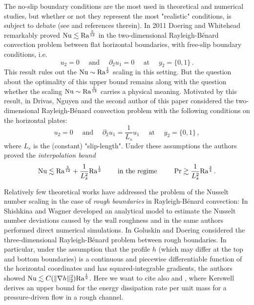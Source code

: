 \documentclass{article}
\theoremstyle{definition}
\theoremstyle{definition}
\newcommand{\Ra}{{\rm{Ra}}}
\newcommand{\Nu}{{\rm{Nu}}}
\begin{document}
The no-slip boundary conditions are the most used in theoretical and numerical studies, but whether or not they represent the most "realistic" conditions, is subject to debate (see \cite{N21} and references therein). In 2011 Doering and Whitehead \cite{whiteheadDoeringUltimateState} remarkably proved $\Nu\lesssim \Ra^{\frac{5}{12}}$ in the two-dimensional Rayleigh-B\'enard convection problem between flat horizontal boundaries, with free-slip boundary conditions, i.e.
$$u_2=0 \quad \mbox{ and } \quad\partial_{2}u_1=0 \quad \mbox{ at }\quad y_2=\{0,1\}\,. $$ 
This result rules out the $\Nu\sim \Ra^{\frac 12}$ scaling in this setting. But the question about the optimality of this upper bound remains along with the question whether the scaling $\Nu\sim \Ra^{\frac{5}{12}}$ carries a physical meaning. Motivated by this result, in \cite{drivasNguyenNobiliBoundsOnHeatFluxForRayleighBenardConvectionBetweenNavierSlipFixedTemperatureBoundaries} Drivas, Nguyen and the second author of this paper considered the two-dimensional Rayleigh-B\'enard convection problem with the following conditions on the horizontal plates:
\begin{equation}
    \label{Navier-slip-straight}
    u_2=0 \quad \mbox{ and } \quad \partial_{2}u_1=\frac{1}{L_s}u_1 \quad\mbox{ at }\quad y_2=\{0,1\}\,,
\end{equation}
where $L_s$ is the (constant) "slip-length". Under these assumptions the authors proved the \textit{interpolation bound}
\begin{align*}
    \Nu\lesssim \Ra^{\frac{5}{12}}+\frac{1}{L_s^2}\Ra^{\frac 12}\qquad \mbox{ in the regime } \qquad\Pr\gtrsim \frac{1}{L_s^2} \Ra^{\frac{3}{4}}\,.  
\end{align*}

Relatively few theoretical works have addressed the problem of the Nusselt number scaling in the case of \textit{rough boundaries} in Rayleigh-B\'enard convection: In \cite{SW11} Shishkina and Wagner developed an analytical model to estimate the Nusselt number deviations caused by the wall roughness and in \cite{WS15} the same authors performed direct numerical simulations.
In \cite{goluskinDoeringBoundsForConvectionBetweenRoughBoundaries} Goluskin and Doering considered the three-dimensional Rayleigh-B\'enard problem between rough boundaries. In particular, under the assumption that the profile $h$ (which may differ at the top and bottom boundaries) is a continuous and piecewise differentiable function of the horizontal coordinates and has squared-integrable gradients, the authors showed $\Nu\lesssim C(\|\nabla h\|_2^2)\Ra^{\frac 12}$.
Here we want to cite also \cite{K16} and \cite{K18}, where Kerswell derives an upper bound for the energy dissipation rate per unit mass for a pressure-driven flow in a rough channel.
\end{document}
